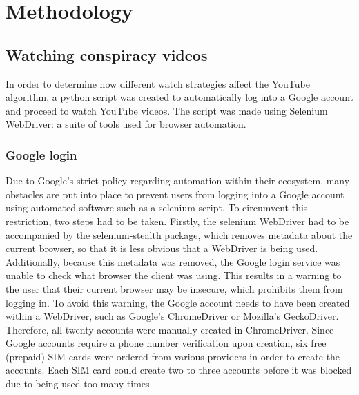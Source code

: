 \documentclass[../main.tex]{subfiles}
\begin{document}
\section{Methodology}
\subsection{Watching conspiracy videos}
In order to determine how different watch strategies affect the YouTube algorithm, a python script was
created to automatically log into a Google account and proceed to watch YouTube videos. The script was
made using Selenium WebDriver: a suite of tools used for browser automation. 

\subsubsection{Google login}
Due to Google's strict policy regarding automation within their ecosystem, many obstacles are put into
place to prevent users from logging into a Google account using automated software such as a selenium 
script. To circumvent this restriction, two steps had to be taken. Firstly, the selenium WebDriver had to
be accompanied by the selenium-stealth package, which removes metadata about the current browser, so that
it is less obvious that a WebDriver is being used. Additionally, because this metadata was removed, the 
Google login service was unable to check what browser the client was using. This results in a warning to 
the user that their current browser may be insecure, which prohibits them from logging in. To avoid this 
warning, the Google account needs to have been created within a WebDriver, such as Google's ChromeDriver 
or Mozilla's GeckoDriver. Therefore, all twenty accounts were manually created in ChromeDriver. Since 
Google accounts require a phone number verification upon creation, six free (prepaid) SIM cards were 
ordered from various providers in order to create the accounts. Each SIM card could create two to three 
accounts before it was blocked due to being used too many times. 
\end{document}
